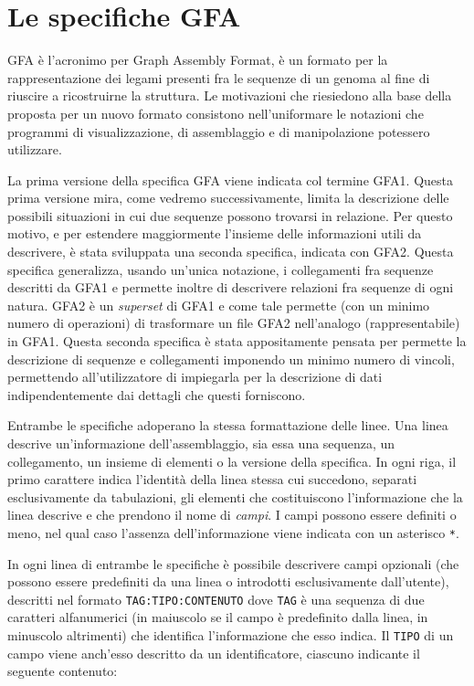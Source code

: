 \chapter{Le specifiche GFA}
GFA è l'acronimo per Graph Assembly Format, è un
formato per la rappresentazione dei legami presenti fra le sequenze di
un genoma al fine di riuscire a ricostruirne la struttura.
Le motivazioni che riesiedono alla base della proposta per un nuovo
formato consistono nell'uniformare le notazioni che programmi
di visualizzazione, di assemblaggio e di manipolazione potessero
utilizzare.

La prima versione della specifica GFA viene indicata col termine
GFA1. Questa prima versione mira, come vedremo successivamente,
limita la descrizione delle possibili situazioni in cui due sequenze
possono trovarsi in relazione. Per questo motivo, e per estendere
maggiormente l'insieme delle informazioni utili da descrivere,
è stata sviluppata una seconda specifica, indicata con GFA2.
Questa specifica generalizza, usando un'unica notazione,
i collegamenti fra sequenze descritti da GFA1 e permette inoltre
di descrivere relazioni fra sequenze di ogni natura.
GFA2 è un \emph{superset} di GFA1 e come tale permette
(con un minimo numero di operazioni) di trasformare un file GFA2
nell'analogo (rappresentabile) in GFA1. Questa seconda specifica
è stata appositamente pensata per permette la descrizione di
sequenze e collegamenti imponendo un minimo numero di vincoli,
permettendo all'utilizzatore di impiegarla per la descrizione di dati
indipendentemente dai dettagli che questi forniscono.

Entrambe le specifiche adoperano la stessa formattazione delle linee.
Una linea descrive un'informazione dell'assemblaggio, sia
essa una sequenza, un collegamento, un insieme di elementi o
la versione della specifica. In ogni riga, il primo carattere indica
l'identità della linea stessa cui succedono, separati esclusivamente
da tabulazioni, gli elementi che costituiscono l'informazione
che la linea descrive e che prendono il nome di \emph{campi}.
I campi possono essere definiti o meno, nel qual caso l'assenza
dell'informazione viene indicata con un asterisco \texttt{*}.

In ogni linea di entrambe le specifiche è possibile descrivere campi
opzionali (che possono essere predefiniti da una linea o introdotti
esclusivamente dall'utente), descritti nel formato \texttt{TAG:TIPO:CONTENUTO}
dove \texttt{TAG} è una sequenza di due caratteri alfanumerici
(in maiuscolo se il campo è predefinito dalla linea, in minuscolo
altrimenti) che identifica l'informazione che esso indica.
Il \texttt{TIPO} di un campo viene anch'esso descritto da un
identificatore, ciascuno indicante il seguente contenuto:

